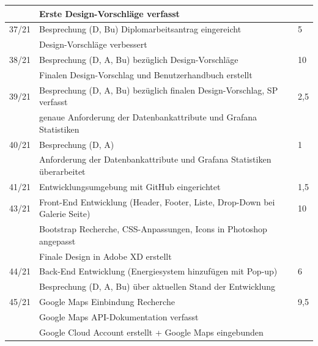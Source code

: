 \begin{table}[h]
\begin{tabular}{|l|l|l|}
		& Erste Design-Vorschläge verfasst & \\ \hline    
37/21   & Besprechung (D, Bu) Diplomarbeitsantrag eingereicht & 5 \\ 
		&  Design-Vorschläge verbessert &\\ \hline
38/21   & Besprechung (D, A, Bu) bezüglich Design-Vorschläge & 10 \\
		& Finalen Design-Vorschlag und Benutzerhandbuch erstellt &  \\ \hline	
39/21   & Besprechung (D, A, Bu) bezüglich finalen Design-Vorschlag, SP verfasst  & 2,5 \\
		& genaue Anforderung der Datenbankattribute und Grafana Statistiken  &  \\ \hline	
40/21   & Besprechung (D, A) & 1 \\
		& Anforderung der Datenbankattribute und Grafana Statistiken überarbeitet  &  \\ \hline	        
41/21   & Entwicklungsumgebung mit GitHub eingerichtet   & 1,5	\\ \hline
43/21   & Front-End Entwicklung (Header, Footer, Liste, Drop-Down bei Galerie Seite) & 10 \\
		& Bootstrap Recherche, CSS-Anpassungen, Icons in Photoshop angepasst   &  \\ 
		& Finale Design in Adobe XD erstellt & \\ \hline	
44/21   & Back-End Entwicklung (Energiesystem hinzufügen mit Pop-up) & 6 \\
		& Besprechung (D, A, Bu) über aktuellen Stand der Entwicklung   &  \\ \hline	     
45/21   & Google Maps Einbindung Recherche & 9,5 \\
		& Google Maps API-Dokumentation verfasst   &  \\ 
		& Google Cloud Account erstellt + Google Maps eingebunden & \\ \hline	
       
	\end{tabular}
\end{table}

